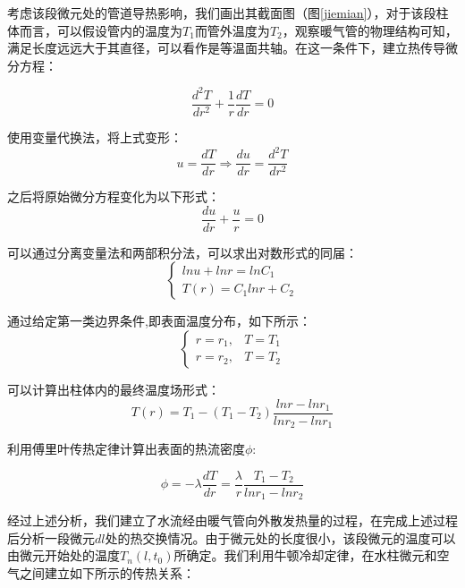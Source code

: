 \documentclass{my_paper}
\begin{document}
考虑该段微元处的管道导热影响，我们画出其截面图（图\ref{jiemian}），对于该段柱体而言，可以假设管内的温度为$T_1$而管外温度为$T_2$，观察暖气管的物理结构可知，满足长度远远大于其直径，可以看作是等温面共轴。在这一条件下，建立热传导微分方程：

\begin{equation}
\frac{d^{2}T}{dr^{2}} + \frac{1}{r}\frac{dT}{dr}=0
\end{equation}

使用变量代换法，将上式变形：
\begin{equation}
u = \frac{dT}{dr} \Rightarrow  \frac{du}{dr}=\frac{d^2T}{dr^2}
\label{}
\end{equation}

之后将原始微分方程变化为以下形式：
\begin{equation}
\frac{du}{dr}+\frac{u}{r} = 0
\label{}
\end{equation}

可以通过分离变量法和两部积分法，可以求出对数形式的同届：
\begin{equation}
    \begin{cases}
        ln u +lnr = lnC_1\\
        T(r) = C_1 lnr + C_2
    \end{cases}
\label{}
\end{equation}

通过给定第一类边界条件\cite{1},即表面温度分布，如下所示：
\begin{equation}
    \begin{cases}
        r = r_1 , & T = T_1\\
        r = r_2 , & T = T_2
    \end{cases}
\end{equation}

可以计算出柱体内的最终温度场形式：
\begin{equation}
    T(r) = T_1 - (T_1-T_2)\frac{lnr - lnr_1}{lnr_2 - lnr_1}
\end{equation}

利用傅里叶传热定律计算出表面的热流密度$\phi$:

\begin{equation}
    \phi = -\lambda \frac{dT}{dr} = \frac{\lambda}{r}\frac{T_1-T_2}{lnr_1-lnr_2}
\end{equation}

经过上述分析，我们建立了水流经由暖气管向外散发热量的过程，在完成上述过程后分析一段微元$dl$处的热交换情况。由于微元处的长度很小，该段微元的温度可以由微元开始处的温度$T_n(l,t_0)$所确定。我们利用牛顿冷却定律\cite{1}，在水柱微元和空气之间建立如下所示的传热关系：
\end{document}
